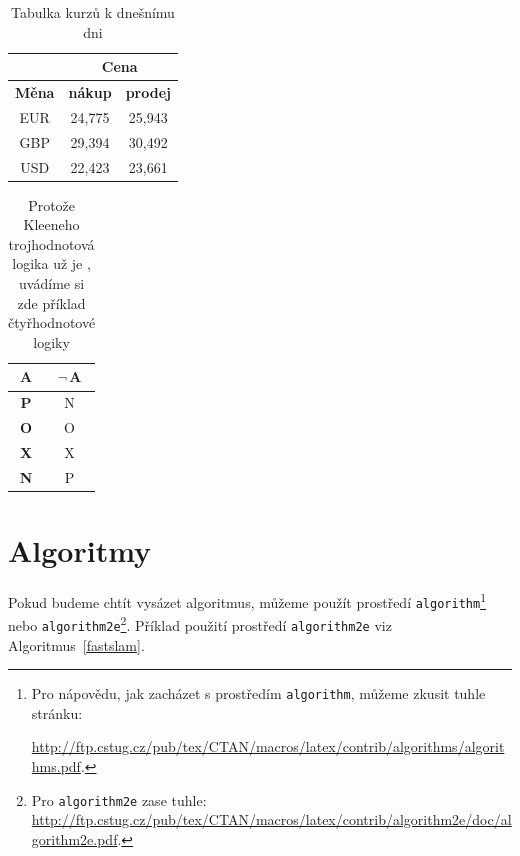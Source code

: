 \documentclass[a4paper, 11pt]{article}
\begin{document}
\begin{table}[h!]
    \centering
    \begin{tabular}{|c|c|c|}
        \hline
        & \multicolumn{2}{|c|}{\textbf{Cena}} \\ \hline
        \textbf{Měna} & \textbf{nákup} & \textbf{prodej} \\ \hline
        EUR & 24,775 & 25,943 \\
        GBP & 29,394 & 30,492 \\
        USD & 22,423 & 23,661 \\ \hline
    \end{tabular}
    \caption{Tabulka kurzů k dnešnímu dni}
    \label{table1}
\end{table}

\begin{table}[h!]
    \centering
    \begin{tabular}{|c|c|}
        \hline
        A & $\neg$\,A \\ \hline
        \textbf{P} & N \\ \hline
        \textbf{O} & O \\ \hline
        \textbf{X} & X \\ \hline
        \textbf{N} & P \\ \hline
    \end{tabular}
    \caption{Protože Kleeneho trojhodnotová logika už je , uvádíme si zde příklad čtyřhodnotové logiky}
    \label{table2}
\end{table}

\pagebreak

\section{Algoritmy}
    \label{algorithms}
    Pokud budeme chtít vysázet algoritmus, můžeme použít prostředí \verb|algorithm|\footnote{Pro nápovědu, jak zacházet s prostředím \texttt{algorithm}, můžeme zkusit tuhle stránku:
    
    \href{http://ftp.cstug.cz/pub/tex/CTAN/macros/latex/contrib/algorithms/algorithms.pdf}{http://ftp.cstug.cz/pub/tex/CTAN/macros/latex/contrib/algorithms/algorithms.pdf}.} nebo \verb|algorithm2e|\footnote{Pro \texttt{algorithm2e} zase tuhle: \href{http://ftp.cstug.cz/pub/tex/CTAN/macros/latex/contrib/algorithm2e/doc/algorithm2e.pdf}{http://ftp.cstug.cz/pub/tex/CTAN/macros/latex/contrib/algorithm2e/doc/algorithm2e.pdf}.}. Příklad použití prostředí \verb|algorithm2e| viz Algoritmus~\ref{fastslam}.
    
\end{document}
